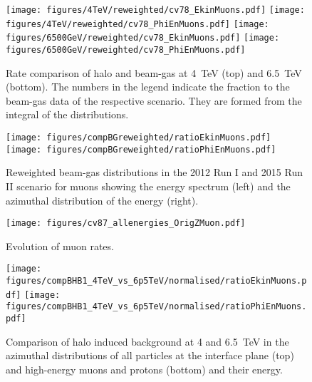 \begin{figure}
\begin{center}
  \texttt{[image: figures/4TeV/reweighted/cv78\_EkinMuons.pdf]}
  \texttt{[image: figures/4TeV/reweighted/cv78\_PhiEnMuons.pdf]}
  \texttt{[image: figures/6500GeV/reweighted/cv78\_EkinMuons.pdf]}
  \texttt{[image: figures/6500GeV/reweighted/cv78\_PhiEnMuons.pdf]}
\end{center}
\vspace{-0.6cm}
 \caption{Rate comparison of halo and beam-gas at 4~TeV (top) and 6.5~TeV (bottom). The numbers in the legend indicate the fraction to the beam-gas data of the respective scenario. They are formed from the integral of the distributions.
  \label{compAllBKG_run12}}
\end{figure}

\begin{figure}%
\centering

\texttt{[image: figures/compBGreweighted/ratioEkinMuons.pdf]}
\texttt{[image: figures/compBGreweighted/ratioPhiEnMuons.pdf]}
\caption{Reweighted beam-gas distributions in the 2012 Run I and 2015 Run II scenario for muons showing the energy spectrum (left) and the azimuthal distribution of the energy (right).
  \label{fig:compBGreweighted1}}
\end{figure}


\begin{figure}
\begin{center}
  \texttt{[image: figures/cv87\_allenergies\_OrigZMuon.pdf]}
\end{center}
\vspace{-0.6cm}
 \caption{Evolution of muon rates. 
  \label{fig:OrigZMuon}} 
\end{figure}




\begin{figure}
\begin{center}

  \texttt{[image: figures/compBHB1\_4TeV\_vs\_6p5TeV/normalised/ratioEkinMuons.pdf]}
  \texttt{[image: figures/compBHB1\_4TeV\_vs\_6p5TeV/normalised/ratioPhiEnMuons.pdf]}

\end{center}
\vspace{-0.6cm}
 \caption{Comparison of halo induced background at 4 and 6.5~TeV in the azimuthal distributions of all particles at the interface plane (top) and high-energy muons and protons (bottom) and their energy.
  \label{compBHB1run1run2}}
\end{figure}


